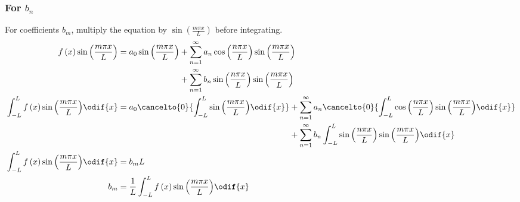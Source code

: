 \documentclass{article}
\begin{document}
\subsubsection{For \texorpdfstring{\(b_n\)}{bn}}
For coefficients \(b_m\), multiply the equation by \(\sin{\left( \frac{m \pi x}{L} \right)}\) before integrating.
\begin{align*}
    f\left( x \right) \sin{\left( \frac{m \pi x}{L} \right)}                      & = \begin{aligned}[t]
                                                                                          a_0 \sin{\left( \frac{m \pi x}{L} \right)} & + \sum_{n = 1}^\infty a_n \cos{\left( \frac{n \pi x}{L} \right)} \sin{\left( \frac{m \pi x}{L} \right)} \\
                                                                                                                                     & + \sum_{n = 1}^\infty b_n \sin{\left( \frac{n \pi x}{L} \right)} \sin{\left( \frac{m \pi x}{L} \right)}
                                                                                      \end{aligned}                                                                                                      \\
    \int_{-L}^L f\left( x \right) \sin{\left( \frac{m \pi x}{L} \right)} \odif{x} & = \begin{aligned}[t]
                                                                                          a_0 \cancelto{0}{\int_{-L}^L \sin{\left( \frac{m \pi x}{L} \right)} \odif{x}} & + \sum_{n = 1}^\infty a_n \cancelto{0}{\int_{-L}^L \cos{\left( \frac{n \pi x}{L} \right)} \sin{\left( \frac{m \pi x}{L} \right)} \odif{x}} \\
                                                                                                                                                                        & + \sum_{n = 1}^\infty b_n \int_{-L}^L \sin{\left( \frac{n \pi x}{L} \right)} \sin{\left( \frac{m \pi x}{L} \right)} \odif{x}
                                                                                      \end{aligned} \\
    \int_{-L}^L f\left( x \right) \sin{\left( \frac{m \pi x}{L} \right)} \odif{x} & = b_m L                                                                                                                                                                                                                                   \\
    b_m                                                                           & = \frac{1}{L} \int_{-L}^L f\left( x \right) \sin{\left( \frac{m \pi x}{L} \right)} \odif{x}
\end{align*}
\end{document}
